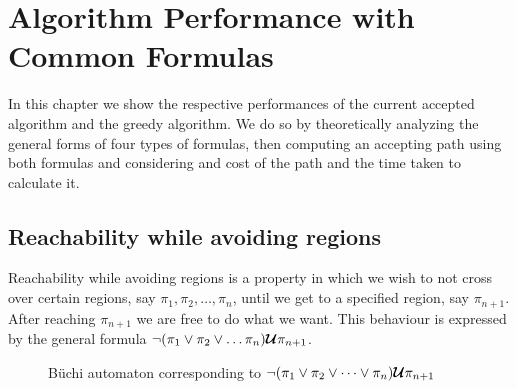\chapter{Algorithm Performance with Common Formulas}
In this chapter we show the respective performances of the current accepted algorithm and the greedy algorithm. We do so by theoretically analyzing the general forms of four types of formulas, then computing an accepting path using both formulas and considering and cost of the path and the time taken to calculate it.%




\section{Reachability while avoiding regions} 
Reachability while avoiding regions is a property in which we wish to not cross over certain regions, say $\pi_1, \pi_2, \dots, \pi_n$, until we get to a specified region, say $\pi_{n+1}$. After reaching $\pi_{n+1}$ we are free to do what we want. This behaviour is expressed by the general formula $\neg (\pi_1 \lor \pi_2 \lor \dots \pi_n) \bm{\mathcal{U}} \pi_{n+1}$. 

\begin{figure}
\centering
{}
\caption{B\"{u}chi automaton corresponding to $\neg (\pi_1 \lor \pi_2 \lor \dots \lor \pi_n) \bm{\mathcal{U}} \pi_{n+1}$}
\label{fig:ReachAvoid}
\end{figure}

